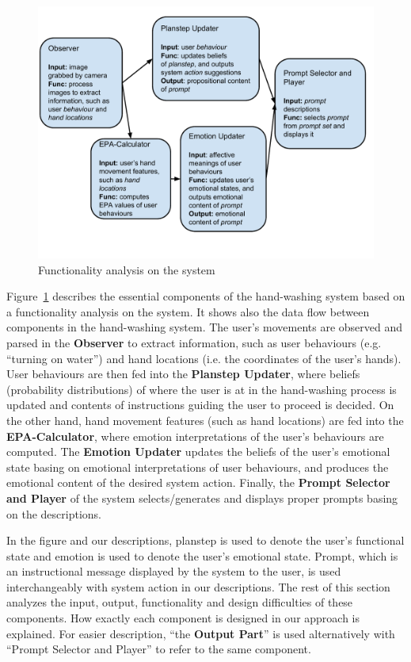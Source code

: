 \begin{figure}[htp]
\centering
\includegraphics[trim = 0mm 15mm 2mm 5mm, clip, width=0.9\linewidth]{fig/fig-components.pdf}
\caption{Functionality analysis on the system}
\label{fig:components}
\end{figure}

Figure~\ref{fig:components} describes the essential components of the hand-washing system based on a functionality analysis on the system. It shows also the data flow between components in the hand-washing system. The user's movements are observed and parsed in the \textbf{Observer} to extract information, such as user behaviours (e.g. ``turning on water'') and hand locations (i.e. the coordinates of the user's hands). User behaviours are then fed into the \textbf{Planstep Updater}, where beliefs (probability distributions) of where the user is at in the hand-washing process is updated and contents of instructions guiding the user to proceed is decided. On the other hand, hand movement features (such as hand locations) are fed into the \textbf{EPA-Calculator}, where emotion interpretations of the user's behaviours are computed. The \textbf{Emotion Updater} updates the beliefs of the user's emotional state basing on emotional interpretations of user behaviours, and produces the emotional content of the desired system action. Finally, the \textbf{Prompt Selector and Player} of the system selects/generates and displays proper prompts basing on the descriptions. 

In the figure and our descriptions, planstep is used to denote the user's functional state and emotion is used to denote the user's emotional state. Prompt, which is an instructional message displayed by the system to the user, is used interchangeably with system action in our descriptions. The rest of this section analyzes the input, output, functionality and design difficulties of these components. How exactly each component is designed in our approach is explained. For easier description, ``the \textbf{Output Part}'' is used alternatively with ``Prompt Selector and Player'' to refer to the same component.

